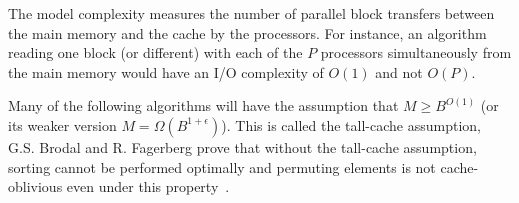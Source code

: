 The model complexity measures the number of parallel block transfers between the main memory and the cache by the processors. For instance, an algorithm reading one block (or different) with each of the $P$ processors simultaneously from the main memory would have an I/O complexity of $O(1)$ and not $O(P)$.

Many of the following algorithms will have the assumption that $M \geq B^{O(1)}$ (or its weaker version $M = \Omega(B^{1 + \epsilon})$). This is called the tall-cache assumption, G.S. Brodal and R. Fagerberg prove that without the tall-cache assumption, sorting cannot be performed optimally and permuting elements is not cache-oblivious even under this property~\cite{brodal2003limits}.









